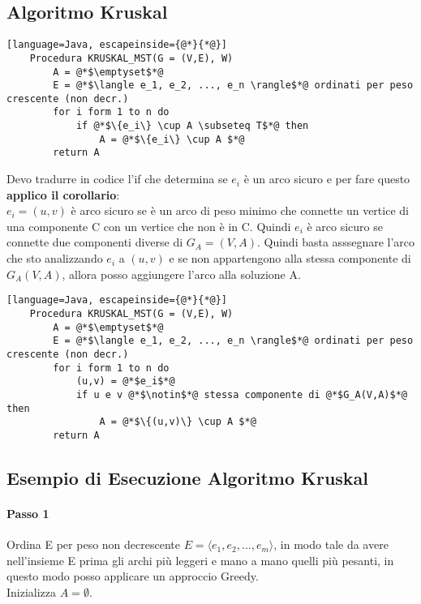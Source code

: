 \subsection{Algoritmo Kruskal}
\begin{lstlisting}[language=Java, escapeinside={@*}{*@}]
    Procedura KRUSKAL_MST(G = (V,E), W)
        A = @*$\emptyset$*@
        E = @*$\langle e_1, e_2, ..., e_n \rangle$*@ ordinati per peso crescente (non decr.)
        for i form 1 to n do
            if @*$\{e_i\} \cup A \subseteq T$*@ then
                A = @*$\{e_i\} \cup A $*@
        return A
\end{lstlisting}
Devo tradurre in codice l'if che determina se $e_i$ è un arco sicuro e per fare questo
\textbf{applico il corollario}:\\
$e_i = (u,v)$ è arco sicuro se è un arco di peso minimo che connette un vertice di una componente C
con un vertice che non è in C. Quindi $e_i$ è arco sicuro se connette due componenti diverse
di $G_A = (V,A)$. Quindi basta asssegnare l'arco che sto analizzando $e_i$ a $(u,v)$ e se
non appartengono alla stessa componente di $G_A(V,A)$, allora posso aggiungere l'arco alla soluzione A.
\begin{lstlisting}[language=Java, escapeinside={@*}{*@}]
    Procedura KRUSKAL_MST(G = (V,E), W)
        A = @*$\emptyset$*@
        E = @*$\langle e_1, e_2, ..., e_n \rangle$*@ ordinati per peso crescente (non decr.)
        for i form 1 to n do
            (u,v) = @*$e_i$*@
            if u e v @*$\notin$*@ stessa componente di @*$G_A(V,A)$*@ then
                A = @*$\{(u,v)\} \cup A $*@
        return A
\end{lstlisting}
\subsection{Esempio di Esecuzione Algoritmo Kruskal}
\paragraph*{Passo 1} Ordina E per peso non decrescente \ra $E=\langle e_1, e_2, ..., e_m\rangle$,
in modo tale da avere nell'insieme E prima gli archi più leggeri e mano a mano quelli più
pesanti, in questo modo posso applicare un approccio Greedy.\\
Inizializza $A = \emptyset$.\\
